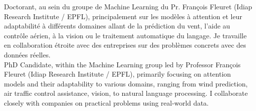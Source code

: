 \commonvspace
\color{deepgray}
\small
\ifFrench
  Doctorant, au sein du groupe de Machine Learning du Pr. François Fleuret (Idiap Research Institute / EPFL), principalement sur les modèles à attention et leur adaptabilité à différents domaines allant de la prédiction du vent, l'aide au contrôle aérien, à la vision ou le traitement automatique du langage. Je travaille en collaboration étroite avec des entreprises sur des problèmes concrets avec des données réelles. \\
\else
  PhD Candidate, within the Machine Learning group led by Professor François Fleuret (Idiap Research Institute / EPFL), primarily focusing on attention models and their adaptability to various domains, ranging from wind prediction, air traffic control assistance, vision, to natural language processing. I collaborate closely with companies on practical problems using real-world data.\\
\fi
\color{deepgray}